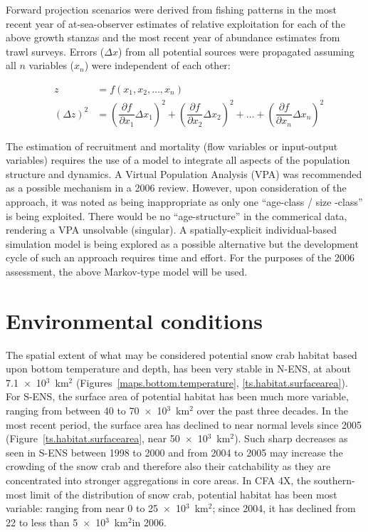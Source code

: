 \documentclass[11pt]{article}
\newcommand{\sq}{$^2$}
\newcommand{\kmsq}{km\sq}
\newcommand{\Xthou}{$\times$~10$^3$}
\begin{document}
Forward projection scenarios were derived from fishing patterns in the most recent year of at-sea-observer estimates of relative exploitation for each of the above growth stanzas and the most recent year of abundance estimates from trawl surveys. Errors ($\Delta x$) from all potential sources were propagated assuming all $n$ variables ($x_n$) were independent of each other:


\begin{eqnarray}
 &  z & = f(x_1, x_2, \ldots, x_n) \\
 & {(\Delta z)}^2 & = {(\dfrac{ \partial f }{\partial x_1 } \Delta x_1)}^2  + 
                   {(\dfrac{ \partial f }{\partial x_2 } \Delta x_2)}^2  +
                  \ldots +
                   {(\dfrac{ \partial f }{\partial x_n } \Delta x_n)}^2
\end{eqnarray}

The estimation of recruitment and mortality (flow variables or input-output variables) requires the use of a model to integrate all aspects of the population structure and dynamics. A Virtual Population Analysis (VPA) was recommended as a possible mechanism in a 2006 review. However, upon consideration of the approach, it was noted as being inappropriate as only one ``age-class / size -class'' is being exploited. There would be no ``age-structure'' in the commerical data, rendering a VPA unsolvable (singular). A spatially-explicit individual-based simulation model is being explored as a possible alternative but the development cycle of such an approach requires time and effort. For the purposes of the 2006 assessment, the above Markov-type model will be used.



\section{Environmental conditions}

The spatial extent of what may be considered potential snow crab habitat based upon bottom temperature and depth, has been very stable in N-ENS, at about 7.1~\Xthou~\kmsq{} (Figures~\ref{maps.bottom.temperature}, \ref{ts.habitat.surfacearea}). For S-ENS, the surface area of potential habitat has been much more variable, ranging from between 40 to 70~\Xthou~\kmsq{} over the past three decades. In the most recent period, the surface area has declined to near normal levels since 2005 (Figure~\ref{ts.habitat.surfacearea}, near 50~\Xthou~\kmsq). Such sharp decreases as seen in S-ENS between 1998 to 2000 and from 2004 to 2005 may increase the crowding of the snow crab and therefore also their catchability as they are concentrated into stronger aggregations in core areas. In CFA 4X, the southern-most limit of the distribution of snow crab, potential habitat has been most variable: ranging from near 0 to 25~\Xthou~\kmsq; since 2004, it has declined from 22 to less than 5~\Xthou~\kmsq in 2006.
\end{document}
